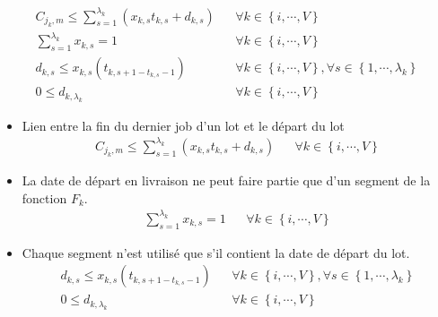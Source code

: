 \begin{align}
	C_{j_k, m} \leq \sum_{s=1}^{\lambda_k} \left( x_{k,s} t_{k, s} + d_{k, s} \right) &  & \forall k \in \left\{i, \cdots, V \right\}                                                    \\
	\sum_{s=1}^{\lambda_k} x_{k, s} = 1                                               &  & \forall k \in \left\{i, \cdots, V \right\}                                                    \\
	d_{k, s} \leq x_{k, s} \left( t_{k, s+1 - t_{k, s} -1} \right)                    &  & \forall k \in \left\{i, \cdots, V \right\}, \forall s \in \left\{1, \cdots, \lambda_k\right\} \\
	0 \leq d_{k, \lambda_k}                                                           &  & \forall k \in \left\{i, \cdots, V \right\}
\end{align}
\begin{itemize}
	\item
	      Lien entre la fin du dernier job d'un lot et le départ du lot
	      \begin{align}
		      C_{j_k, m} \leq \sum_{s=1}^{\lambda_k} \left( x_{k,s} t_{k, s} + d_{k, s} \right) &  & \forall k \in \left\{i, \cdots, V \right\}
	      \end{align}
	\item
	      La date de départ en livraison ne peut faire partie que d'un segment de la fonction $F_k$.
	      \begin{align}
		      \sum_{s=1}^{\lambda_k} x_{k, s} = 1 &  & \forall k \in \left\{i, \cdots, V \right\}
	      \end{align}
	\item
	      Chaque segment n'est utilisé que s'il contient la date de départ du lot.
	      \begin{align}
		      d_{k, s} \leq x_{k, s} \left( t_{k, s+1 - t_{k, s} -1} \right) &  & \forall k \in \left\{i, \cdots, V \right\}, \forall s \in \left\{1, \cdots, \lambda_k\right\} \\
		      0 \leq d_{k, \lambda_k}                                        &  & \forall k \in \left\{i, \cdots, V \right\}
	      \end{align}
\end{itemize}

